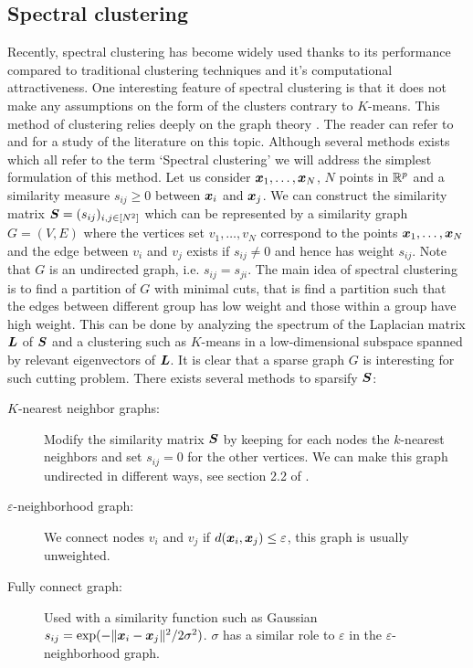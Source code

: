 \subsection{Spectral clustering}
Recently, spectral clustering has become widely used thanks to its performance compared to traditional clustering techniques and it's computational attractiveness. One interesting feature of spectral clustering is that it does not make any assumptions on the form of the clusters contrary to $K$-means. This method of clustering relies deeply on the graph theory \citep{Donath:1973:LBP:1664638.1664644,Fiedler1973}. The reader can refer to \citep{Luxburg:2007:TSC:1288822.1288832} and \citep{SPIELMAN2007284} for a study of the literature on this topic. Although several methods exists which all refer to the term `Spectral clustering' we will address the simplest formulation of this method. Let us consider $\boldsymbol x_1,\dots,\boldsymbol x_N$, $N$ points in ${\mathbb R}^p$ and a similarity measure $s_{ij} \geq 0$ between $\boldsymbol x_i$ and $\boldsymbol x_j$. We can construct the similarity matrix $\boldsymbol S=(s_{ij})_{i,j\in [N^2]}$ which can be represented by a similarity graph $G=(V,E)$ where the vertices set $v_1,\dots,v_N$ correspond to the points $\boldsymbol x_1,\dots,\boldsymbol x_N$ and the edge between $v_i$ and $v_j$ exists if $s_{ij}\neq 0 $ and hence has weight $s_{ij}$. Note that $G$ is an undirected graph, i.e. $s_{ij}=s_{ji}$. The main idea of spectral clustering is to find a partition of $G$ with minimal cuts, that is find a partition such that the edges between different group has low weight and those within a group have high weight. This can be done by analyzing the spectrum of the Laplacian matrix $\boldsymbol L$ of $\boldsymbol S$ and a clustering such as $K$-means in a low-dimensional subspace spanned by relevant eigenvectors of $\boldsymbol L$. It is clear that a sparse graph $G$ is interesting for such cutting problem. There exists several methods to sparsify $\boldsymbol S$: 
\begin{description}
\item[$K$-nearest neighbor graphs:] Modify the similarity matrix $\boldsymbol S$ by keeping for each nodes the $k$-nearest neighbors and set $s_{ij}=0$ for the other vertices. We can make this graph undirected in different ways, see section 2.2 of \citep{Luxburg:2007:TSC:1288822.1288832}.
\item[$\varepsilon$-neighborhood graph:] We connect nodes $v_i$ and $v_j$ if $d(\boldsymbol x_i,\boldsymbol x_j)\leq \varepsilon$, this graph is usually unweighted.
\item[Fully connect graph:] Used with a similarity function such as Gaussian $s_{ij}=\exp(-\|\boldsymbol x_i-\boldsymbol x_j\|^2/2\sigma^2)$. $\sigma$ has a similar role to $\varepsilon$ in the $\varepsilon$-neighborhood graph.
\end{description}
